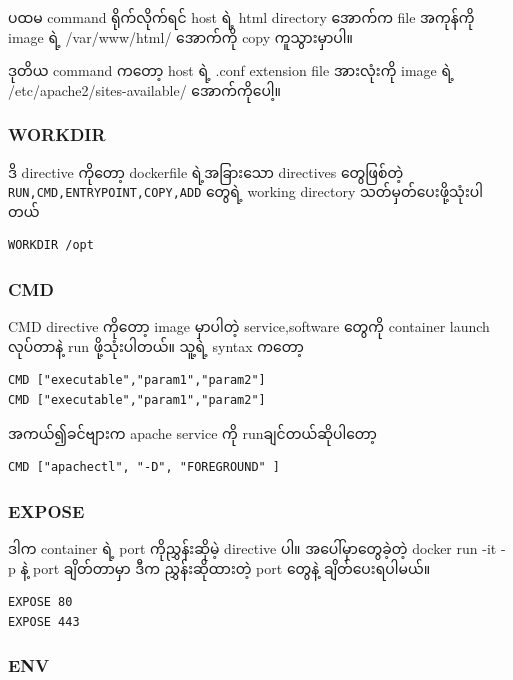 \documentclass{article}
\begin{document}
ပထမ command ရိုက်​လိုက်​ရင်​ host ရဲ့ html directory ​အောက်​က file
အကုန်​ကို image ရဲ့ /var/www/html/ ​အောက်​ကို copy ကူသွားမှာပါ။

ဒုတိယ command က​တော့ host ရဲ့ .conf extension file အားလုံးကို image ရဲ့
/etc/apache2/sites-available/ ​အောက်​ကို​ပေါ့။

\subsubsection{WORKDIR}\label{workdir}

ဒိ directive ကို​တော့ dockerfile ရဲ့အခြား​သော directives ​တွေဖြစ်​တဲ့
\texttt{RUN,CMD,ENTRYPOINT,COPY,ADD} ​တွေရဲ့ working directory
သတ်​မှတ်​​ပေးဖို့သုံးပါတယ်​

\begin{verbatim}
WORKDIR /opt
\end{verbatim}

\subsubsection{CMD}\label{cmd}

CMD directive ကို​တော့ image မှာပါတဲ့ service,software ​တွေကို container
launch လုပ်​​တာနဲ့ run ဖို့သုံးပါတယ်။​ သူ့ရဲ့ syntax က​တော့

\begin{verbatim}
CMD ["executable","param1","param2"]
CMD ["executable","param1","param2"]
\end{verbatim}

အကယ်​၍ခင်​​ဗျားက apache service ကို runချင်​တယ်​ဆိုပါ​တော့

\begin{verbatim}
CMD ["apachectl", "-D", "FOREGROUND" ]
\end{verbatim}

\subsubsection{EXPOSE}\label{expose}

ဒါက container ရဲ့ port ကိုညွှန်းဆိုမဲ့ directive ပါ။ အ​ပေါ်မှာ​တွေခဲ့တဲ့
docker run -it -p နဲ့ port ချိတ်​တာမှာ ဒီက ညွှန်းဆိုထားတဲ့ port ​တွေနဲ့
ချိတ်​​ပေးရပါမယ်​။

\begin{verbatim}
EXPOSE 80
EXPOSE 443
\end{verbatim}

\subsubsection{ENV}\label{env}
\end{document}
